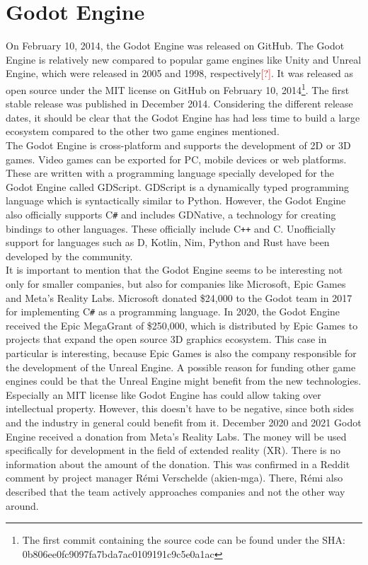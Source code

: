 \section{Godot Engine}
On February 10, 2014, the Godot Engine was released on GitHub.
The Godot Engine is relatively new compared to popular game engines like Unity and Unreal Engine, which were released in 2005 and 1998, respectively\textcolor{red}{[?]}.
It was released as open source under the MIT license on GitHub on February 10, 2014\footnote{The first commit containing the source code can be found under the SHA:\\ 0b806ee0fc9097fa7bda7ac0109191c9c5e0a1ac}\cite{godot-repository}.
The first stable release was published in December 2014\cite{godot-release}.
Considering the different release dates, it should be clear that the Godot Engine has had less time to build a large ecosystem compared to the other two game engines mentioned.\\

The Godot Engine is cross-platform and supports the development of 2D or 3D games\cite{godot-engine}.
Video games can be exported for PC, mobile devices or web platforms.
These are written with a programming language specially developed for the Godot Engine called GDScript.
GDScript is a dynamically typed programming language which is syntactically similar to Python.
However, the Godot Engine also officially supports C\texttt{\#} and includes GDNative, a technology for creating bindings to other languages\cite{godot-gdnative}.
These officially include C\texttt{++} and C.
Unofficially support for languages such as D, Kotlin, Nim, Python and Rust have been developed by the community.\\

It is important to mention that the Godot Engine seems to be interesting not only for smaller companies, but also for companies like Microsoft, Epic Games and Meta's Reality Labs.
Microsoft donated \$24,000 to the Godot team in 2017 for implementing C\texttt{\#} as a programming language\cite{godot-csharp}.
In 2020, the Godot Engine received the Epic MegaGrant of \$250,000, which is distributed by Epic Games to projects that expand the open source 3D graphics ecosystem\cite{godot-megagrant}.
This case in particular is interesting, because Epic \linebreak Games is also the company responsible for the development of the Unreal Engine.
A possible reason for funding other game engines could be that the Unreal Engine might benefit from the new technologies.
Especially an MIT license like Godot Engine has could allow taking over intellectual property.
However, this doesn't have to be negative, since both sides and the industry in general could benefit from it.
December 2020 and 2021 Godot Engine received a donation from Meta's Reality Labs\cite{godot-facebook-reality}\cite{godot-meta-reality}.
The money will be used specifically for development in the field of extended reality (XR).
There is no information about the amount of the donation.
This was confirmed in a Reddit comment by project manager Rémi Verschelde (akien-mga)\cite{reddit-companies-akien}.
There, Rémi also described that the team actively approaches companies and not the other way around.
